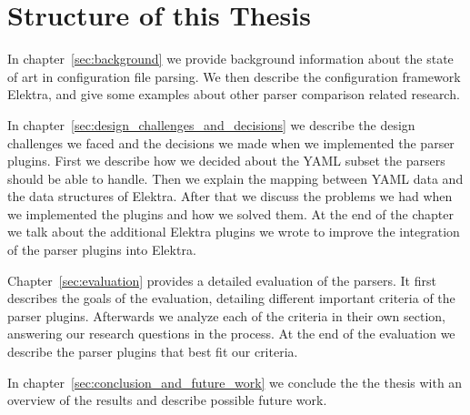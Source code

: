 \section{Structure of this Thesis}

In chapter~\ref{sec:background} we provide background information about the state of art in configuration file parsing. We then describe the configuration framework Elektra, and give some examples about other parser comparison related research.

In chapter~\ref{sec:design_challenges_and_decisions} we describe the design challenges we faced and the decisions we made when we implemented the parser plugins. First we describe how we decided about the YAML subset the parsers should be able to handle. Then we explain the mapping between YAML data and the data structures of Elektra. After that we discuss the problems we had when we implemented the plugins and how we solved them. At the end of the chapter we talk about the additional Elektra plugins we wrote to improve the integration of the parser plugins into Elektra.

Chapter~\ref{sec:evaluation} provides a detailed evaluation of the parsers. It first describes the goals of the evaluation, detailing different important criteria of the parser plugins. Afterwards we analyze each of the criteria in their own section, answering our research questions in the process. At the end of the evaluation we describe the parser plugins that best fit our criteria.

In chapter~\ref{sec:conclusion_and_future_work} we conclude the the thesis with an overview of the results and describe possible future work.
